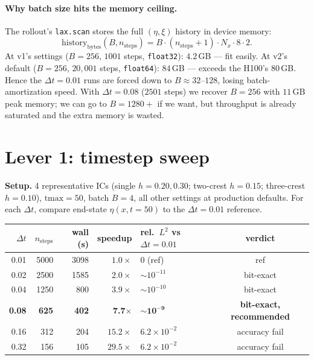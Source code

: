 \documentclass[11pt]{article}
\begin{document}
\paragraph{Why batch size hits the memory ceiling.} The rollout's
\texttt{lax.scan} stores the full $(\eta, \xi)$ history in device memory:
\[
\text{history}_{\text{bytes}}(B, n_{\text{steps}}) = B \cdot (n_{\text{steps}}+1) \cdot N_x \cdot 8 \cdot 2.
\]
At v1's settings ($B=256$, $1001$ steps, \texttt{float32}): $4.2$\,GB --- fit easily.
At v2's default ($B=256$, $20{,}001$ steps, \texttt{float64}): $84$\,GB --- exceeds the
H100's $80$\,GB. Hence the $\Delta t=0.01$ runs are forced down to $B \approx 32$--$128$,
losing batch-amortization speed. With $\Delta t=0.08$ ($2501$ steps) we recover
$B=256$ with $11$\,GB peak memory; we can go to $B=1280+$ if we want, but
throughput is already saturated and the extra memory is wasted.

\section{Lever 1: timestep sweep}
\label{sec:dt-sweep}

\textbf{Setup.} 4 representative ICs (single $h\!=\!0.20, 0.30$; two-crest $h\!=\!0.15$;
three-crest $h\!=\!0.10$), $\text{tmax}=50$, batch $B=4$, all other settings at
production defaults. For each $\Delta t$, compare end-state $\eta(x, t\!=\!50)$ to the
$\Delta t = 0.01$ reference.

\begin{center}
\begin{tabular}{rrrrlc}
\toprule
$\Delta t$ & $n_\text{steps}$ & wall (s) & speedup & rel.~$L^2$ vs $\Delta t\!=\!0.01$ & verdict \\
\midrule
0.01 & 5000 & 3098 & $1.0\times$ & $0$ (ref) & ref \\
0.02 & 2500 & 1585 & $2.0\times$ & $\sim\!10^{-11}$ & bit-exact \\
0.04 & 1250 &  800 & $3.9\times$ & $\sim\!10^{-10}$ & bit-exact \\
\textbf{0.08} & \textbf{ 625} & \textbf{ 402} & \textbf{7.7$\times$} & $\boldsymbol{\sim\!10^{-9}}$ & \textbf{bit-exact, recommended} \\
0.16 &  312 &  204 & $15.2\times$ & $6.2\!\times\!10^{-2}$ & accuracy fail \\
0.32 &  156 &  105 & $29.5\times$ & $6.2\!\times\!10^{-2}$ & accuracy fail \\
\bottomrule
\end{tabular}
\end{center}
\end{document}
